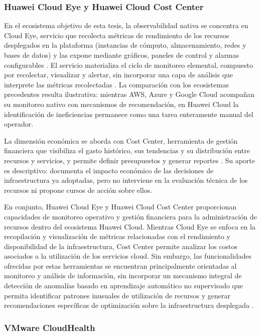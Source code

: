 \subsubsection{Huawei Cloud Eye y Huawei Cloud Cost Center}

En el ecosistema objetivo de esta tesis, la observabilidad nativa se concentra en Cloud Eye, servicio que recolecta métricas de rendimiento de los recursos desplegados en la plataforma (instancias de cómputo, almacenamiento, redes y bases de datos) y las expone mediante gráficos, paneles de control y alarmas configurables \parencite{HuaweiCloud2026}. El servicio materializa el ciclo de monitoreo elemental, compuesto por recolectar, visualizar y alertar, sin incorporar una capa de análisis que interprete las métricas recolectadas \parencite{HuaweiCloud2026}. La comparación con los ecosistemas precedentes resulta ilustrativa: mientras AWS, Azure y Google Cloud acompañan su monitoreo nativo con mecanismos de recomendación, en Huawei Cloud la identificación de ineficiencias permanece como una tarea enteramente manual del operador.

La dimensión económica se aborda con Cost Center, herramienta de gestión financiera que visibiliza el gasto histórico, sus tendencias y su distribución entre recursos y servicios, y permite definir presupuestos y generar reportes \parencite{HuaweiCloud2026}. Su aporte es descriptivo: documenta el impacto económico de las decisiones de infraestructura ya adoptadas, pero no interviene en la evaluación técnica de los recursos ni propone cursos de acción sobre ellos.

En conjunto, Huawei Cloud Eye y Huawei Cloud Cost Center proporcionan capacidades de monitoreo operativo y gestión financiera para la administración de recursos dentro del ecosistema Huawei Cloud. Mientras Cloud Eye se enfoca en la recopilación y visualización de métricas relacionadas con el rendimiento y disponibilidad de la infraestructura, Cost Center permite analizar los costos asociados a la utilización de los servicios cloud. Sin embargo, las funcionalidades ofrecidas por estas herramientas se encuentran principalmente orientadas al monitoreo y análisis de información, sin incorporar un mecanismo integral de detección de anomalías basado en aprendizaje automático no supervisado que permita identificar patrones inusuales de utilización de recursos y generar recomendaciones específicas de optimización sobre la infraestructura desplegada \parencite{HuaweiCloud2026}.

\subsubsection{VMware CloudHealth}

